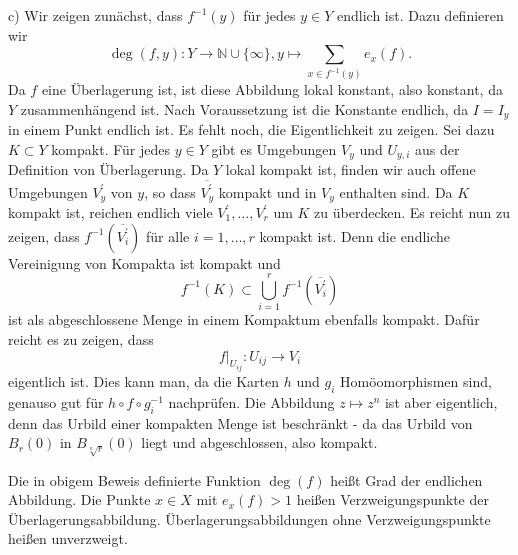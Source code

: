 \documentclass[10pt, letterpaper]{article}
\begin{document}
c) Wir zeigen zunächst, dass $f^{-1}(y)$ für jedes $y \in Y$ endlich ist. Dazu definieren wir
$$
\operatorname{deg}(f, y): Y \rightarrow \mathbb{N} \cup\{\infty\}, y \mapsto \sum_{x \in f^{-1}(y)} e_{x}(f) .
$$
Da $f$ eine Überlagerung ist, ist diese Abbildung lokal konstant, also konstant, da $Y$ zusammenhängend ist. Nach Voraussetzung ist die Konstante endlich, da $I=I_{y}$ in einem Punkt endlich ist. Es fehlt noch, die Eigentlichkeit zu zeigen. Sei dazu $K \subset Y$ kompakt. Für jedes $y \in Y$ gibt es Umgebungen $V_{y}$ und $U_{y, i}$ aus der Definition von Überlagerung. Da $Y$ lokal kompakt ist, finden wir auch offene Umgebungen $V_{y}^{\prime}$ von $y$, so dass $\overline{V_{y}^{\prime}}$ kompakt und in $V_{y}$ enthalten sind. Da $K$ kompakt ist, reichen endlich viele $V_{1}^{\prime}, \ldots, V_{r}^{\prime}$ um $K$ zu überdecken. Es reicht nun zu zeigen, dass $f^{-1}\left(\overline{V_{i}^{\prime}}\right)$ für alle $i=1, \ldots, r$ kompakt ist. Denn die endliche Vereinigung von Kompakta ist kompakt und 
$$f^{-1}(K) \subset \bigcup_{i=1}^{r} f^{-1}\left(\overline{V_{i}^{\prime}}\right)$$ 
ist als abgeschlossene Menge in einem Kompaktum ebenfalls kompakt. Dafür reicht es zu zeigen, dass 
$$\left.f\right|_{U_{i j}}: U_{i j} \rightarrow V_{i}$$ 
eigentlich ist. Dies kann man, da die Karten $h$ und $g_{i}$ Homöomorphismen sind, genauso gut für $h \circ f \circ g_{i}^{-1}$ nachprüfen. Die Abbildung $z \mapsto z^{n}$ ist aber eigentlich, denn das Urbild einer kompakten Menge ist beschränkt - da das Urbild von $B_{r}(0)$ in $B_{\sqrt[n]{r}}(0)$ liegt und abgeschlossen, also kompakt.



Die in obigem Beweis definierte Funktion $\operatorname{deg}(f)$ heißt Grad der endlichen Abbildung. Die Punkte $x \in X$ mit $e_{x}(f)>1$ heißen Verzweigungspunkte der Überlagerungsabbildung. Überlagerungsabbildungen ohne Verzweigungspunkte heißen unverzweigt.
\end{document}
